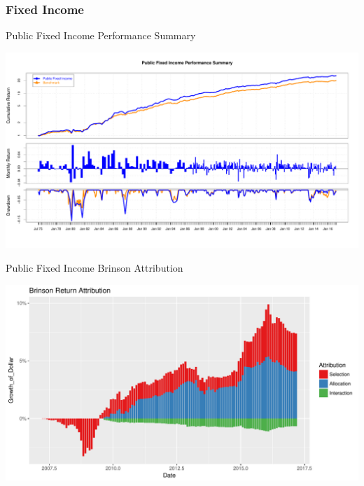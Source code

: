 \documentclass[10pt,english]{beamer}\usepackage[]{graphicx}\usepackage[]{color}
\makeatletter
\def\maxwidth{ %
  \ifdim\Gin@nat@width>\linewidth
    \linewidth
  \else
    \Gin@nat@width
  \fi
}
\newenvironment{knitrout}{}{} %
\makeatother
\begin{document}
\subsubsection{Fixed Income}
\begin{frame}[fragile]{Public Fixed Income Performance Summary}

\begin{knitrout}
\color{fgcolor}
\includegraphics[width=\maxwidth]{figure/fi_summary-1} 

\end{knitrout}
\end{frame}
%
\begin{frame}[fragile]{Public Fixed Income Brinson Attribution}

\begin{knitrout}
\color{fgcolor}
\includegraphics[width=\maxwidth]{figure/fi_attribution-1} 

\end{knitrout}
\end{frame}
%
\end{document}

